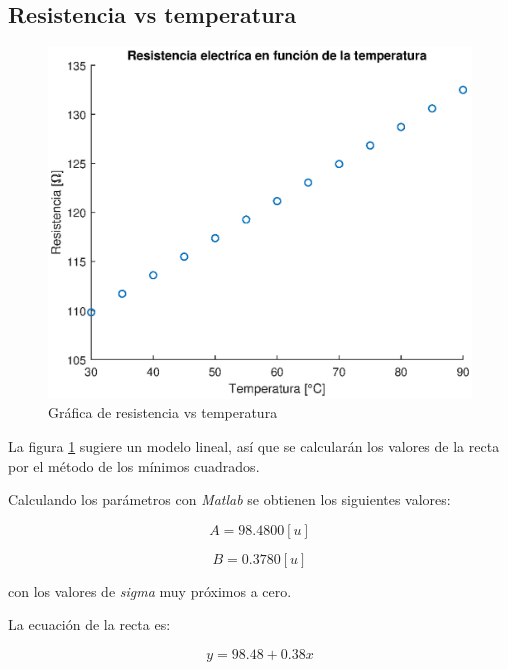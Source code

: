 \documentclass[letter,11pt]{article}
\begin{document}
\subsection{Resistencia vs temperatura}
\begin{figure}[!h]
\centering
\includegraphics[scale=1.00]{eps/3.3.1.eps}
\caption{Gráfica de resistencia vs temperatura}
\label{practica43}
\end{figure}

La figura \ref{practica43} sugiere un modelo lineal, así que se calcularán los
valores de la recta por el método de los mínimos cuadrados.

Calculando los parámetros con \emph{Matlab} se obtienen los siguientes valores:

\begin{equation}
    A = 98.4800 [u]
\end{equation}

\begin{equation}
    B = 0.3780 [u]
\end{equation}

con los valores de \emph{sigma} muy próximos a cero.

La ecuación de la recta es:

\begin{equation}
    y = 98.48 + 0.38 x
\end{equation}
\end{document}
